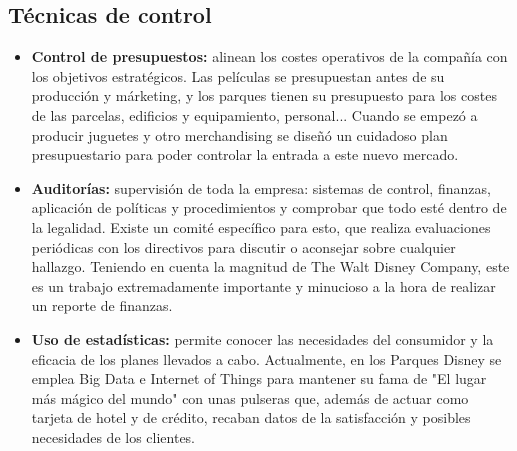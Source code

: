 \subsection{Técnicas de control}
\begin{itemize}

\item\textbf{Control de presupuestos:} alinean los costes operativos de la compañía con los objetivos estratégicos. Las películas se presupuestan antes de su producción y márketing, y los  parques tienen su presupuesto para los costes de las parcelas, edificios y equipamiento, personal... Cuando se empezó a producir juguetes y otro merchandising se diseñó un cuidadoso plan presupuestario para poder controlar la entrada a este nuevo mercado.

\item\textbf{Auditorías:} supervisión de toda la empresa: sistemas de control, finanzas, aplicación de políticas y procedimientos y comprobar que todo esté dentro de la legalidad. Existe un comité específico para esto, que realiza evaluaciones periódicas con los directivos para discutir o aconsejar sobre cualquier hallazgo. Teniendo en cuenta la magnitud de The Walt Disney Company, este es un trabajo extremadamente importante y minucioso  a la hora de realizar un reporte de finanzas.

\item\textbf{Uso de estadísticas:} permite conocer las necesidades del consumidor y la eficacia de los planes llevados a cabo. Actualmente, en los Parques Disney se emplea Big Data e Internet of Things  para mantener su fama de "El lugar más mágico del mundo" con unas pulseras que, además de actuar como tarjeta de hotel y de crédito,  recaban datos de la satisfacción y posibles necesidades de los clientes.

\end{itemize}